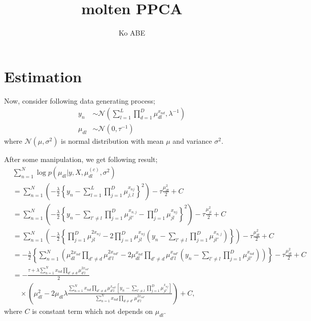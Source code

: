 \documentclass[12pt]{amsart}
\title{molten PPCA}
\author{Ko ABE}
\begin{document}
\maketitle

\section{Estimation}

Now, consider following data generating process; 
\begin{align*}
y_n &\sim \mathcal{N}\left(\sum_{l=1}^L \prod_{d=1}^D\mu_{dl}^{x_{nd}}, \lambda^{-1}\right)\\
\mu_{dl} & \sim \mathcal{N}(0,\tau^{-1}) %
\end{align*}
where $\mathcal{N}(\mu,\sigma^2)$ is normal distribution with mean $\mu$ and variance $\sigma^2$. 

After some manipulation, we get following result; 
\begin{align*}
&\sum_{n=1}^{N} \log p(\mu_{dl}|y, X, \mu_{dl}^{(c)},\sigma^2)\\
&= \sum_{n=1}^{N}\left(-\frac{\lambda}{2}\left\{ y_n -\sum_{l=1}^L\prod_{j=1}^D \mu_{j,l}^{x_{nj}} \right\}^2\right) -\tau \frac{\mu_{dl}^2}{2} + C\\
&= \sum_{n=1}^{N}\left(-\frac{\lambda}{2}\left\{ y_n -\sum_{l'\neq l}\prod_{j=1}^D \mu_{jl'}^{x_{n,j}}-\prod_{j=1}^D \mu_{jl}^{x_{nj}} \right\}^2\right)-\tau \frac{\mu_{jl}^2}{2}+ C\\
&=\sum_{n=1}^{N}\left(-\frac{\lambda}{2}\left\{\prod_{j =1}^D \mu_{jl}^{2x_{nj}}-2\prod_{j=1}^D \mu_{jl}^{x_{nj}}\left(y_n -\sum_{l'\neq l}\prod_{j=1}^D \mu_{jl'}^{x_{n,j}}\right) \right\}\right) -\tau \frac{\mu_{dl}^2}{2} + C\\
&=-\frac{\lambda}{2}\left\{\sum_{n=1}^N \left( \mu_{dl}^{2x_{nd}}\prod_{d'\neq d} \mu_{d'l}^{2x_{nd'}} - 2 \mu_{dl}^{x_{nd}}\prod_{d' \neq d} \mu_{d'l}^{x_{nd'}}\left(y_n -\sum_{l'\neq l}\prod_{j=1}^D \mu_{jl'}^{x_{nd}}\right) \right)\right\} -\tau \frac{\mu_{dl}^2}{2} + C\\
&=-\frac{\tau  + \lambda \sum_{n=1}^N x_{nd}\prod_{d' \neq d} \mu_{d'l}^{2x_{nd'}} }{2} \\
&\quad \times \left(\mu_{dl}^{2}-2 \mu_{dl} \lambda \frac{\sum_{n=1}^N x_{nd}\prod_{d' \neq d} \mu_{d'l}^{x_{nd'}} \left[y_n -\sum_{l'\neq l}\prod_{j=1}^D \mu_{jl'}^{x_{nj}}  \right] }{\sum_{n=1}^N x_{nd}\prod_{d\neq d'} \mu_{d'l}^{2x_{nd'}} }\right) + C,
\end{align*}
where $C$ is constant term which not depends on $\mu_{dl}$.
\end{document}
